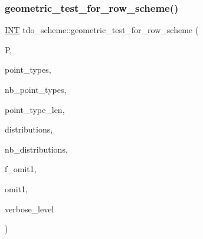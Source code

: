 \subsubsection{\texorpdfstring{geometric\+\_\+test\+\_\+for\+\_\+row\+\_\+scheme()}{geometric\_test\_for\_row\_scheme()}}
{\footnotesize\ttfamily \mbox{\hyperlink{galois_8h_a09fddde158a3a20bd2dcadb609de11dc}{I\+NT}} tdo\+\_\+scheme\+::geometric\+\_\+test\+\_\+for\+\_\+row\+\_\+scheme (\begin{DoxyParamCaption}\item[{\mbox{\hyperlink{classpartitionstack}{partitionstack}} \&}]{P,  }\item[{\mbox{\hyperlink{galois_8h_a09fddde158a3a20bd2dcadb609de11dc}{I\+NT}} $\ast$}]{point\+\_\+types,  }\item[{\mbox{\hyperlink{galois_8h_a09fddde158a3a20bd2dcadb609de11dc}{I\+NT}}}]{nb\+\_\+point\+\_\+types,  }\item[{\mbox{\hyperlink{galois_8h_a09fddde158a3a20bd2dcadb609de11dc}{I\+NT}}}]{point\+\_\+type\+\_\+len,  }\item[{\mbox{\hyperlink{galois_8h_a09fddde158a3a20bd2dcadb609de11dc}{I\+NT}} $\ast$}]{distributions,  }\item[{\mbox{\hyperlink{galois_8h_a09fddde158a3a20bd2dcadb609de11dc}{I\+NT}}}]{nb\+\_\+distributions,  }\item[{\mbox{\hyperlink{galois_8h_a09fddde158a3a20bd2dcadb609de11dc}{I\+NT}}}]{f\+\_\+omit1,  }\item[{\mbox{\hyperlink{galois_8h_a09fddde158a3a20bd2dcadb609de11dc}{I\+NT}}}]{omit1,  }\item[{\mbox{\hyperlink{galois_8h_a09fddde158a3a20bd2dcadb609de11dc}{I\+NT}}}]{verbose\+\_\+level }\end{DoxyParamCaption})}

\mbox{\label{classtdo__scheme_a95704cce3da89d5acaf04e4fef05866d}} 
